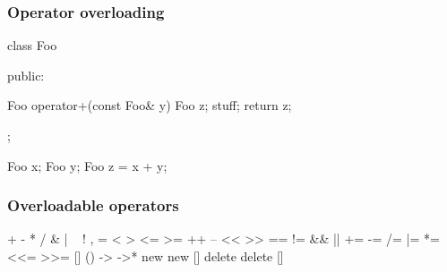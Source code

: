 \begin{frame}[fragile]
  \frametitle{Operator overloading}

\begin{c++}
class Foo
{
public:

  Foo operator+(const Foo& y)
  {
    Foo z;
    stuff;
    return z;
  }

};

Foo x;
Foo y;
Foo z = x + y;
\end{c++}

\end{frame}

\begin{frame}[fragile]
  \frametitle{Overloadable operators}

\begin{c++}
+	-	*	/	%
&	|	~	!	,	=
<	>	<=	>=	++	--
<<	>>	==	!=	&&	||
+=	-=	/=	%
|=	*=	<<=	>>=	[]	()
->	->*	new	new []	delete	delete []
\end{c++}

\end{frame}
